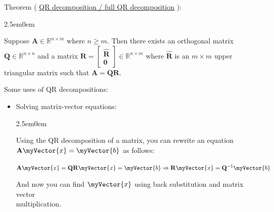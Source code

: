 \documentclass{book}
\newcommand{\hTwo}{%
   \color{MidnightBlue}%
   \fontsize{13}{15}\selectfont%
}
\newenvironment{myIndent}{%
   \begin{adjustwidth}{2.5em}{0em}%
}{%
   \end{adjustwidth}%
}
\newcommand{\udefine}[1]{%
   {\setulcolor{Red}%
   \setul{0.14em}{0.07em}%
   \ul{#1}}%
}
\newcommand{\retTwo}{\hfill\bigbreak}
\newcommand{\mVec}[1]{\myVector{#1}}
\newcommand{\mMat}[1]{\mathbf{#1}}
\begin{document}
   Theorem (\udefine{QR decomposition / full QR decomposition}):
   {\begin{myIndent}
      Suppose $\mMat{A} \in \mathbb{R}^{n \times m}$ where $n \geq m$. Then there exists an orthogonal matrix $\mMat{Q} \in \mathbb{R}^{n\times n}$ and a matrix $\mMat{R} = \begin{bmatrix}\hat{\mMat{R}}\\\mMat{0}\end{bmatrix} \in \mathbb{R}^{n \times m}$ where $\hat{\mMat{R}}$ is an $m \times m$ upper triangular matrix such that $\mMat{A} = \mMat{Q}\mMat{R}$.
   \end{myIndent}}
   \newpage
   Some uses of QR decompositions:
   \begin{itemize}
      \item Solving matrix-vector equations:
      {\begin{myIndent} \hTwo
         Using the QR decomposition of a matrix, you can rewrite an equation $\mMat{A}\mVec{x} = \mVec{b}$ as follows:
         
         {\centering$\mMat{A}\mVec{x} = \mMat{Q}\mMat{R}\mVec{x} = \mVec{b} \Rightarrow \mMat{R}\mVec{x} = \mMat{Q}^{-1}\mVec{b}$\par}
         
         And now you can find $\mVec{x}$ using back substitution and matrix vector\\ multiplication. \retTwo
      \end{myIndent}}


\end{itemize}
\end{document}
